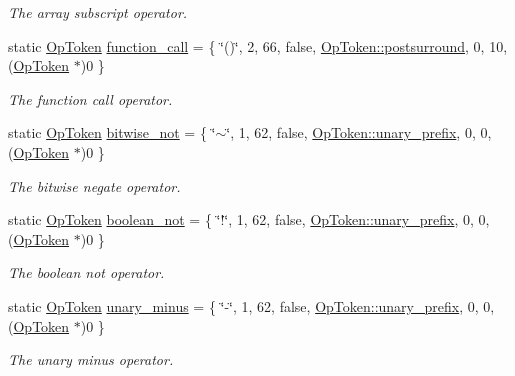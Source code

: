 \begin{DoxyCompactItemize}
\begin{DoxyCompactList}\small\item\em The array subscript operator. \end{DoxyCompactList}\item 
static \mbox{\hyperlink{class_op_token}{Op\+Token}} \mbox{\hyperlink{class_print_c_a808485afc527ab6629ad9193fe0db7f6}{function\+\_\+call}} = \{ \char`\"{}()\char`\"{}, 2, 66, false, \mbox{\hyperlink{class_op_token_af41c7f108d5662ede7765c5a6c44eaffa82a30068870b08542e958e828d6464fa}{Op\+Token\+::postsurround}}, 0, 10, (\mbox{\hyperlink{class_op_token}{Op\+Token}} $\ast$)0 \}
\begin{DoxyCompactList}\small\item\em The {\itshape function} {\itshape call} operator. \end{DoxyCompactList}\item 
static \mbox{\hyperlink{class_op_token}{Op\+Token}} \mbox{\hyperlink{class_print_c_a176b30b5cecd9879b0dadd0dcc628068}{bitwise\+\_\+not}} = \{ \char`\"{}$\sim$\char`\"{}, 1, 62, false, \mbox{\hyperlink{class_op_token_af41c7f108d5662ede7765c5a6c44eaffa0d809c13f66611247b81856fc9e68289}{Op\+Token\+::unary\+\_\+prefix}}, 0, 0, (\mbox{\hyperlink{class_op_token}{Op\+Token}} $\ast$)0 \}
\begin{DoxyCompactList}\small\item\em The {\itshape bitwise} {\itshape negate} operator. \end{DoxyCompactList}\item 
static \mbox{\hyperlink{class_op_token}{Op\+Token}} \mbox{\hyperlink{class_print_c_a643d3b211527b727681fab774516d19c}{boolean\+\_\+not}} = \{ \char`\"{}!\char`\"{}, 1, 62, false, \mbox{\hyperlink{class_op_token_af41c7f108d5662ede7765c5a6c44eaffa0d809c13f66611247b81856fc9e68289}{Op\+Token\+::unary\+\_\+prefix}}, 0, 0, (\mbox{\hyperlink{class_op_token}{Op\+Token}} $\ast$)0 \}
\begin{DoxyCompactList}\small\item\em The {\itshape boolean} {\itshape not} operator. \end{DoxyCompactList}\item 
static \mbox{\hyperlink{class_op_token}{Op\+Token}} \mbox{\hyperlink{class_print_c_ac432b442df9751d73278efcb58c666b8}{unary\+\_\+minus}} = \{ \char`\"{}-\/\char`\"{}, 1, 62, false, \mbox{\hyperlink{class_op_token_af41c7f108d5662ede7765c5a6c44eaffa0d809c13f66611247b81856fc9e68289}{Op\+Token\+::unary\+\_\+prefix}}, 0, 0, (\mbox{\hyperlink{class_op_token}{Op\+Token}} $\ast$)0 \}
\begin{DoxyCompactList}\small\item\em The {\itshape unary} {\itshape minus} operator. \end{DoxyCompactList}\item 

\end{DoxyCompactItemize}

